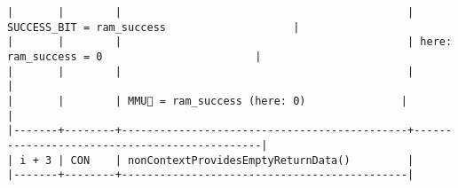 \documentclass[varwidth=\maxdimen,margin=0.5cm,multi={verbatim}]{standalone}
\begin{document}
\begin{verbatim}
|       |        |                                             | SUCCESS_BIT = ram_success                    |
|       |        |                                             | here: ram_success = 0                        |
|       |        |                                             |                                              |
|       |        | MMU🏴 = ram_success (here: 0)               |                                              |
|-------+--------+---------------------------------------------+----------------------------------------------|
| i + 3 | CON    | nonContextProvidesEmptyReturnData()         |
|-------+--------+---------------------------------------------|
\end{verbatim}
\end{document}

